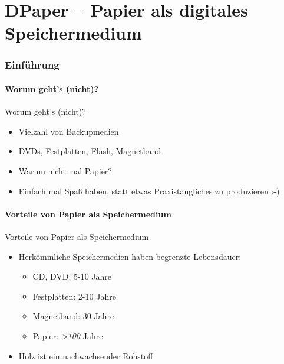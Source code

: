 \part{DPaper -- Papier als digitales Speichermedium}

\section{Einführung}

\subsection{Worum geht's (nicht)?}
\begin{frame}[<+->]{Worum geht's (nicht)?}
	\begin{itemize}
	\item Vielzahl von Backupmedien
	\item DVDs, Festplatten, Flash, Magnetband
	\item Warum nicht mal Papier?
	\item Einfach mal Spaß haben, statt etwas Praxistaugliches zu produzieren :-)
	\end{itemize}
\end{frame}

\subsection{Vorteile von Papier als Speichermedium}
\begin{frame}[<+->]{Vorteile von Papier als Speichermedium}
	\pause
	\begin{itemize}
	\item Herkömmliche Speichermedien haben begrenzte Lebensdauer:
		\begin{itemize}
		\item CD, DVD: 5-10 Jahre
		\item Festplatten: 2-10 Jahre
		\item Magnetband: 30 Jahre
		\item Papier: \emph{>100} Jahre
		\end{itemize}
	\item Holz ist ein nachwachsender Rohstoff
	\end{itemize}
\end{frame}

